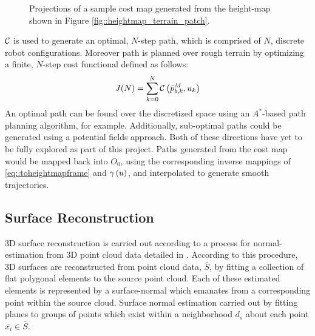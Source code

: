 				\begin{figure}[!h]
					\centering
					\caption{Projections of a sample cost map generated from the height-map shown in Figure \ref{fig::heightmap_terrain_patch}.}
					\label{fig::cost_map}
				\end{figure}

			${\cal C}$ is used to generate an optimal, $N$-step path, which is comprised of $N$, discrete robot configurations. Moreover path is planned over rough terrain by optimizing a finite, $N$-step cost functional defined as follows:
				\begin{equation}			
					J(N) = \sum_{k=0}^N {\cal C}\left(\bar{p}^{M}_{b,k},u_{k}\right)
				\end{equation}	
			An optimal path can be found over the discretized space using an $A^{*}$-based path planning algorithm, for example. Additionally, sub-optimal paths could be generated using a potential fields approach. Both of these directions have yet to be fully explored as part of this project. Paths generated from the cost map would be mapped back into $O_{0}$, using the corresponding inverse mappings of \ref{eq::toheightmapframe} and $\gamma\left(u\right)$, and interpolated to generate smooth trajectories.
				


		\subsection{Surface Reconstruction}

			3D surface reconstruction is carried out according to a process for normal-estimation from 3D point cloud data detailed in \cite{Rusu2009}. According to this procedure, 3D surfaces are reconstructed from point cloud data, $\bar{S}$, by fitting a collection of flat polygonal elements to the source point cloud. Each of these estimated elements is represented by a surface-normal which emanates from a corresponding point within the source cloud. Surface normal estimation carried out by fitting planes to groups of points which exist within a neighborhood $d_{s}$ about each point $\bar{x_{i}}\in\bar{S}$.

